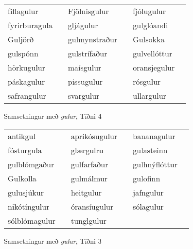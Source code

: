 \documentclass[../samsetningasafn.tex]{subfiles}
\begin{document}
\begin{wordlist}[H]
\begin{tcolorbox}

	\setlength{\extrarowheight}{3pt}
	\begin{tabular}{BlBlBl}	
		fíflagulur		& 	\phantom{baa}	& 		
		Fjölnisgulur	& 	\phantom{baa}	& 		
		fjólugulur	& 	\phantom{baa}	\\ 		
		fyrirburagula	&		& 	
		gljágulur		&		& 		
		gulglóandi	&		\\ 		
		Guljörð		&		& 		
		gulmynstraður & 		& 	
		Gulsokka	&		\\ 	
		gulspónn	&		& 	
		gulstrífaður	&		& 		
		gulvellóttur	&		\\ 		
		hörkugulur	&		& 		
		maísgulur	&		& 		
		oransjegulur	&		\\ 	
		páskagulur	&		& 		
		pissugulur	&		& 		
		rósgulur		&		\\ 		
		safrangulur	&		& 		
		svargulur	&		& 		
		ullargulur	&		 		
	\end{tabular}

\end{tcolorbox}
	\caption{Samsetningar með \textit{gulur}, Tíðni 4}
	\label{listi:gult.4}
\end{wordlist}

\begin{wordlist}[H]
\begin{tcolorbox}

	\setlength{\extrarowheight}{3pt}
	\begin{tabular}{BlBlBl}	
		antikgul		& 	  \phantom{baa}	& 		
		apríkósugulur & 	\phantom{baa} 	& 	
		bananagulur	&	\phantom{baa}	\\ 	
		fósturgula	&		& 		
		glærgulru	&		& 		
		gulasteinn	&		\\ 		
		gulblómgaður & 		& 	
		gulfarfaður	&		& 		
		gulhnýflóttur	&		\\ 	
		Gulkolla		&		& 	
		gulmálmur	&		& 	
		gulofinn		& 		\\ 	
		gulusjúkur	&		& 	
		heitgulur		&		& 	
		jafngulur	&		\\ 	
		nikótíngulur	&		& 	
		óransíugulur	&		& 	
		sólagulur	&		\\ 	
		sólblómagulur &		& 	
		tunglgulur	&		& 
					&
	\end{tabular}

\end{tcolorbox}
	\caption{Samsetningar með \textit{gulur}, Tíðni 3}
	\label{listi:gult.3}
\end{wordlist}
\end{document}
